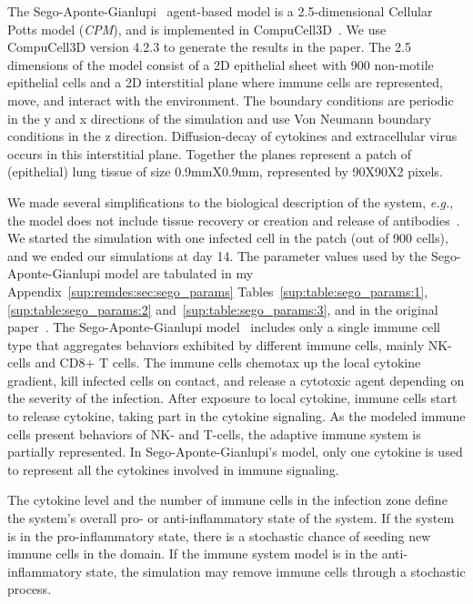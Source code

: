 The Sego-Aponte-Gianlupi~\cite{sego_modular_2020} agent-based model is a 2.5-dimensional Cellular Potts model (\emph{CPM}), and is implemented in CompuCell3D~\cite{swat_multi-scale_2012}. We use CompuCell3D version 4.2.3 to generate the results in the paper. The 2.5 dimensions of the model consist of a 2D epithelial sheet with 900 non-motile epithelial cells and a 2D interstitial plane where immune cells are represented, move, and interact with the environment. The boundary conditions are periodic in the y and x directions of the simulation and use Von Neumann boundary conditions in the z direction. Diffusion-decay of cytokines and extracellular virus occurs in this interstitial plane. Together the planes represent a patch of (epithelial) lung tissue of size 0.9mmX0.9mm, represented by 90X90X2 pixels. 

We made several simplifications to the biological description of the system, \emph{e.g.}, the model does not include tissue recovery or creation and release of antibodies~\cite{sego_modular_2020}. We started the simulation with one infected cell in the patch (out of 900 cells), and we ended our simulations at day 14.  The parameter values used by the Sego-Aponte-Gianlupi model are tabulated in my Appendix~\ref{sup:remdes:sec:sego_params} Tables~\ref{sup:table:sego_params:1}, \ref{sup:table:sego_params:2} and~\ref{sup:table:sego_params:3}, and in the original paper~\cite{sego_modular_2020}. The Sego-Aponte-Gianlupi model~\cite{sego_modular_2020} includes only a single immune cell type that aggregates behaviors exhibited by different immune cells, mainly NK-cells and CD8+ T cells. The immune cells chemotax up the local cytokine gradient, kill infected cells on contact, and release a cytotoxic agent depending on the severity of the infection. After exposure to local cytokine, immune cells start to release cytokine, taking part in the cytokine signaling. As the modeled immune cells present behaviors of NK-  and T-cells, the adaptive immune system is partially represented. In Sego-Aponte-Gianlupi's model, only one cytokine is used to represent all the cytokines involved in immune signaling. 

The cytokine level and the number of immune cells in the infection zone define the system's overall pro- or anti-inflammatory state of the system. If the system is in the pro-inflammatory state, there is a stochastic chance of seeding new immune cells in the domain. If the immune system model is in the anti-inflammatory state, the simulation may remove immune cells through a stochastic process.

